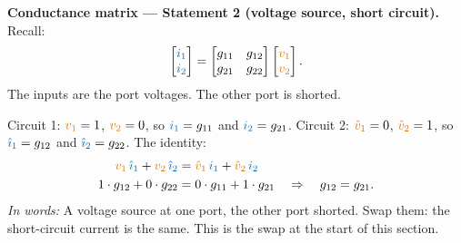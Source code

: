 \documentclass[11pt,a4paper]{article}
\newcommand{\Icol}[1]{\textcolor{ccur}{#1}}
\newcommand{\Vcol}[1]{\textcolor{cvolt}{#1}}
\newcommand{\uni}[1]{\,\mathrm{#1}}
\newcommand{\A}{\uni{A}}   \newcommand{\V}{\uni{V}}
\newcommand{\vone}{\Vcol{v_1}}  \newcommand{\vtwo}{\Vcol{v_2}}
\newcommand{\ione}{\Icol{i_1}}  \newcommand{\itwo}{\Icol{i_2}}
\newcommand{\rcp}[4]{%
  \draw[elem] (1.6,-0.2) rectangle (3.8,2.2);
  \node[align=center, font=\small] at (2.7,1.0) {LTI\\ resistors};
  \draw (1.1,1.8) -- (1.6,1.8); \draw (1.1,0) -- (1.6,0);
  \draw (3.8,1.8) -- (4.3,1.8); \draw (3.8,0) -- (4.3,0);
  \ifcase#1
    \draw (0,1.8) to[american voltage source, l_=#2] (0,0); \draw (0,1.8) -- (1.1,1.8); \draw (0,0) -- (1.1,0);
  \or
    \draw (0,0) to[american current source, l=#2] (0,1.8); \draw (0,1.8) -- (1.1,1.8); \draw (0,0) -- (1.1,0);
  \or
    \draw (0,1.8) -- (0,0); \draw (0,1.8) -- (1.1,1.8); \draw (0,0) -- (1.1,0);
    \draw[iar] (0.25,2.08) -- (0.85,2.08); \node[font=\small, anchor=south] at (0.55,2.12) {#2};
  \or
    \node[pol] at (1.05,1.45) {$+$}; \node[pol] at (1.05,0.35) {$-$};
    \node[font=\small, anchor=east] at (1.0,0.9) {#2};
  \or
    \draw (0,1.8) -- (0,1.22); \draw (0,0.58) -- (0,0);
    \node[circle, draw, thick, minimum size=0.64cm, inner sep=0pt, font=\small\bfseries] at (0,0.9) {A};
    \node[font=\small, anchor=east] at (-0.38,0.9) {#2};
    \draw (0,1.8) -- (1.1,1.8); \draw (0,0) -- (1.1,0);
  \fi
  \ifcase#3
    \draw (5.4,1.8) to[american voltage source, l=#4] (5.4,0); \draw (4.3,1.8) -- (5.4,1.8); \draw (4.3,0) -- (5.4,0);
  \or
    \draw (5.4,0) to[american current source, l_=#4] (5.4,1.8); \draw (4.3,1.8) -- (5.4,1.8); \draw (4.3,0) -- (5.4,0);
  \or
    \draw (5.4,1.8) -- (5.4,0); \draw (4.3,1.8) -- (5.4,1.8); \draw (4.3,0) -- (5.4,0);
    \draw[iar] (5.15,2.08) -- (4.55,2.08); \node[font=\small, anchor=south] at (4.85,2.12) {#4};
  \or
    \node[pol] at (4.35,1.45) {$+$}; \node[pol] at (4.35,0.35) {$-$};
    \node[font=\small, anchor=west] at (4.4,0.9) {#4};
  \or
    \draw (5.4,1.8) -- (5.4,1.22); \draw (5.4,0.58) -- (5.4,0);
    \node[circle, draw, thick, minimum size=0.64cm, inner sep=0pt, font=\small\bfseries] at (5.4,0.9) {A};
    \node[font=\small, anchor=west] at (5.78,0.9) {#4};
    \draw (4.3,1.8) -- (5.4,1.8); \draw (4.3,0) -- (5.4,0);
  \fi
  \draw (1.1,1.8) node[ocirc] {}; \draw (1.1,0) node[ocirc] {};
  \draw (4.3,1.8) node[ocirc] {}; \draw (4.3,0) node[ocirc] {};}
\newcommand{\lcur}[1]{\draw[iar] (0.25,2.08) -- (0.85,2.08); \node[font=\small, anchor=south] at (0.55,2.12) {#1};}
\newcommand{\rcur}[1]{\draw[iar] (5.15,2.08) -- (4.55,2.08); \node[font=\small, anchor=south] at (4.85,2.12) {#1};}
\newcommand{\mtest}[2]{%
  \ifnum#2=1
    \if#1R \rcp{1}{$\Icol{1\A}$}{3}{$\Vcol{r_{21}}$}\fi
    \if#1G \rcp{0}{$\Vcol{1\V}$}{2}{$\Icol{g_{21}}$}\lcur{$\Icol{g_{11}}$}\fi
    \if#1H \rcp{1}{$\Icol{1\A}$}{2}{$\Icol{h_{21}}$}\fi
    \if#1T \rcp{0}{$\Vcol{A}$}{3}{$\Vcol{1\V}$}\lcur{$\Icol{C}$}\fi
  \else
    \if#1R \rcp{3}{$\Vcol{r_{12}}$}{1}{$\Icol{1\A}$}\fi
    \if#1G \rcp{2}{$\Icol{g_{12}}$}{0}{$\Vcol{1\V}$}\rcur{$\Icol{g_{22}}$}\fi
    \if#1H \rcp{3}{$\Vcol{h_{12}}$}{0}{$\Vcol{1\V}$}\rcur{$\Icol{h_{22}}$}\fi
    \if#1T \rcp{0}{$\Vcol{B}$}{2}{$\Icol{-1\A}$}\lcur{$\Icol{D}$}\fi
  \fi}
\newcommand{\mpair}[1]{%
  \mtest{#1}{1}
  \begin{scope}[xshift=7.8cm] \mtest{#1}{2} \end{scope}
  \node[font=\small, text=metugray] at (2.7,-0.75) {circuit 1};
  \node[font=\small, text=metugray] at (10.5,-0.75) {circuit 2};}
\begin{document}
\noindent\textbf{Conductance matrix --- Statement 2 (voltage source, short circuit).} Recall:
\[
  \begin{bmatrix} \ione\\ \itwo \end{bmatrix} = \begin{bmatrix} g_{11} & g_{12}\\ g_{21} & g_{22} \end{bmatrix} \begin{bmatrix} \vone\\ \vtwo \end{bmatrix} .
\]
The inputs are the port voltages. The other port is shorted.
\begin{center}
\end{center}
Circuit 1: $\vone = 1$, $\vtwo = 0$, so $\ione = g_{11}$ and $\itwo = g_{21}$. Circuit 2: $\Vcol{\hat v_1} = 0$, $\Vcol{\hat v_2} = 1$, so $\Icol{\hat\imath_1} = g_{12}$ and $\Icol{\hat\imath_2} = g_{22}$. The identity:
\begin{align*}
  \vone\,\Icol{\hat\imath_1} + \vtwo\,\Icol{\hat\imath_2} &= \Vcol{\hat v_1}\,\ione + \Vcol{\hat v_2}\,\itwo\\
  1 \cdot g_{12} + 0 \cdot g_{22} &= 0 \cdot g_{11} + 1 \cdot g_{21} \quad\Rightarrow\quad g_{12} = g_{21} .
\end{align*}
\emph{In words:} A voltage source at one port, the other port shorted. Swap them: the short-circuit current is the same. This is the swap at the start of this section.
\end{document}
